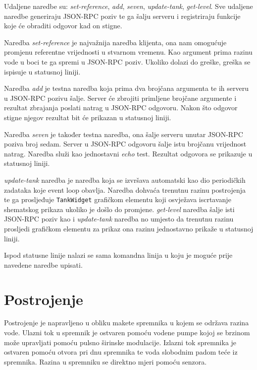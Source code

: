 Udaljene naredbe su: \emph{set-reference}, \emph{add}, \emph{seven},
\emph{update-tank}, \emph{get-level}. Sve udaljene naredbe generiraju JSON-RPC
poziv te ga šalju serveru i registriraju funkcije koje će obraditi odgovor kad
on stigne.

Naredba \emph{set-reference} je najvažnija naredba klijenta, ona nam omogućuje
promjenu referentne vrijednosti u stvarnom vremenu. Kao argument prima razinu
vode u boci te ga spremi u JSON-RPC poziv. Ukoliko dolazi do greške, greška se
ispisuje u statusnoj liniji.

Naredba \emph{add} je testna naredba koja prima dva brojčana argumenta te ih
serveru u JSON-RPC pozivu šalje. Server će zbrojiti primljene brojčane argumente
i rezultat zbrajanja poslati natrag u JSON-RPC odgovoru. Nakon što odgovor
stigne njegov rezultat bit će prikazan u statusnoj liniji.

Naredba \emph{seven} je također testna naredba, ona šalje serveru unutar
JSON-RPC poziva broj sedam. Server u JSON-RPC odgovoru šalje istu brojčanu
vrijednost natrag. Naredba služi kao jednostavni \emph{echo} test. Rezultat
odgovora se prikazuje u statusnoj liniji.

\emph{update-tank} naredba je naredba koja se izvršava automatski kao dio
periodičkih zadataka koje event loop obavlja. Naredba dohvaća trenutnu razinu
postrojenja te ga prosljeđuje \texttt{TankWidget} grafičkom elementu
koji osvježava iscrtavanje shematskog prikaza ukoliko je došlo do promjene.
\emph{get-level} naredba šalje isti JSON-RPC poziv kao i \emph{update-tank}
naredba no umjesto da trenutnu razinu prosljedi grafičkom elementu za prikaz ona
razinu jednostavno prikaže u statusnoj liniji.

Ispod statusne linije nalazi se sama komandna linija u koju je moguće prije
navedene naredbe upisati.

\newpage
\section{Postrojenje}

Postrojenje je napravljeno u obliku makete spremnika u kojem se održava razina
vode. Ulazni tok u spremnik je ostvaren pomoću vodene pumpe kojoj se brzinom
može upravljati pomoću pulsno širinske modulacije. Izlazni tok spremnika je
ostvaren pomoću otvora pri dnu spremnika te voda slobodnim padom teće iz
spremnika. Razina u spremniku se direktno mjeri pomoću senzora.


